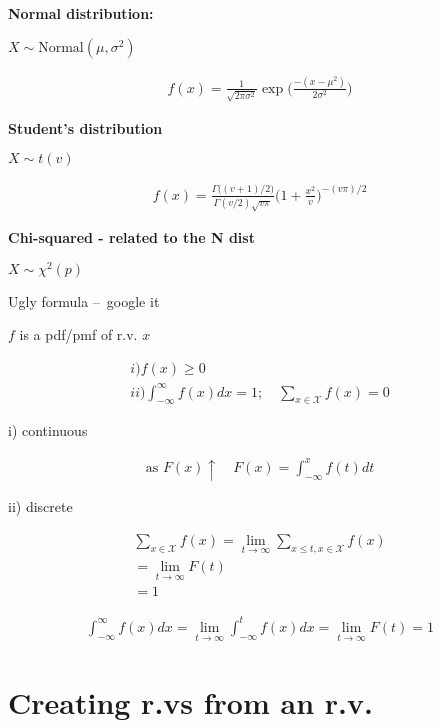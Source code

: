 \documentclass[10pt]{article}
\begin{document}
\textbf{Normal distribution:}

$X \sim \text{Normal}(\mu, \sigma^2)$

\begin{align*}
    f(x) = \frac{1}{\sqrt{2\pi \sigma^2}}\exp \bigg(\frac{-(x - \mu^2)}{2\sigma^2}\bigg)
\end{align*}

\textbf{Student's distribution}

$X \sim t(v)$

\begin{align*}
    f(x) = \frac{\Gamma\big((v + 1) / 2\big)}{\Gamma(v/2)\sqrt{v\pi}} \bigg(1 + \frac{x^2}{v}\bigg)^{-(v\pi) / 2}
\end{align*}

\textbf{Chi-squared - related to the N dist}

$X \sim \chi^2(p)$

Ugly formula – google it

\newpage

$f$ is a pdf/pmf of r.v. $x$

\begin{align*}
    i) f(x) \geq 0\\
    ii) \int_{-\infty}^{\infty}f(x)dx = 1; \quad \sum_{x \in \mathcal{X}}f(x) = 0
\end{align*}


i) continuous 

\begin{align*}
    \text{as } F(x) \uparrow\quad F(x) = \int_{-\infty}^{x}f(t)dt
\end{align*}

ii) discrete

\begin{align*}
    \sum_{x \in \mathcal{X}} f(x) = \lim_{t \to \infty} \sum_{x \leq t, x \in \mathcal{X}}f(x)\\
    = \lim_{t \to \infty} F(t)\\
    = 1
\end{align*}

\begin{align*}
    \int_{-\infty}^{\infty}f(x) dx = \lim_{t \to \infty} \int_{-\infty}^{t} f(x) dx = \lim_{t \to \infty} F(t) = 1
\end{align*}

\newpage

\section{Creating r.vs from an r.v.}
\end{document}
